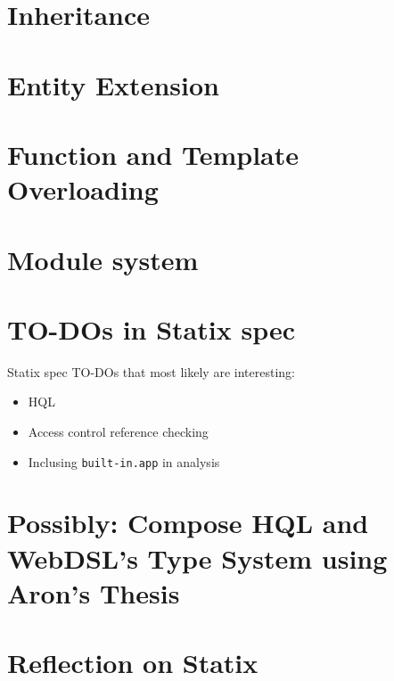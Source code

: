   \section{Inheritance}

  \section{Entity Extension}

  \section{Function and Template Overloading}

  \section{Module system}

  \section{TO-DOs in Statix spec}
  
    Statix spec TO-DOs that most likely are interesting:
    \begin{itemize}
      \item HQL
      \item Access control reference checking
      \item Inclusing \texttt{built-in.app} in analysis
    \end{itemize}

  \section{Possibly: Compose HQL and WebDSL's Type System using Aron's Thesis}

  \section{Reflection on Statix}
